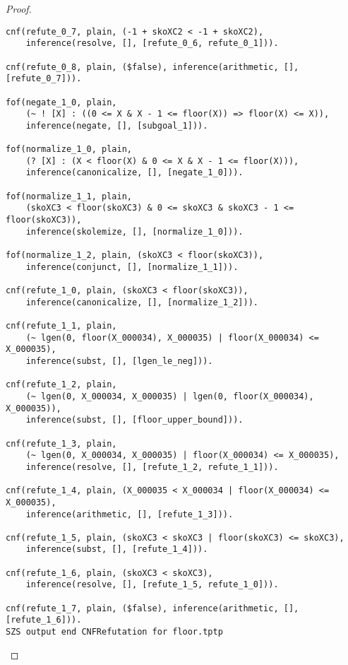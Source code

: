 \begin{proof}
\begin{verbatim}
cnf(refute_0_7, plain, (-1 + skoXC2 < -1 + skoXC2),
    inference(resolve, [], [refute_0_6, refute_0_1])).

cnf(refute_0_8, plain, ($false), inference(arithmetic, [], [refute_0_7])).

fof(negate_1_0, plain,
    (~ ! [X] : ((0 <= X & X - 1 <= floor(X)) => floor(X) <= X)),
    inference(negate, [], [subgoal_1])).

fof(normalize_1_0, plain,
    (? [X] : (X < floor(X) & 0 <= X & X - 1 <= floor(X))),
    inference(canonicalize, [], [negate_1_0])).

fof(normalize_1_1, plain,
    (skoXC3 < floor(skoXC3) & 0 <= skoXC3 & skoXC3 - 1 <= floor(skoXC3)),
    inference(skolemize, [], [normalize_1_0])).

fof(normalize_1_2, plain, (skoXC3 < floor(skoXC3)),
    inference(conjunct, [], [normalize_1_1])).

cnf(refute_1_0, plain, (skoXC3 < floor(skoXC3)),
    inference(canonicalize, [], [normalize_1_2])).

cnf(refute_1_1, plain,
    (~ lgen(0, floor(X_000034), X_000035) | floor(X_000034) <= X_000035),
    inference(subst, [], [lgen_le_neg])).

cnf(refute_1_2, plain,
    (~ lgen(0, X_000034, X_000035) | lgen(0, floor(X_000034), X_000035)),
    inference(subst, [], [floor_upper_bound])).

cnf(refute_1_3, plain,
    (~ lgen(0, X_000034, X_000035) | floor(X_000034) <= X_000035),
    inference(resolve, [], [refute_1_2, refute_1_1])).

cnf(refute_1_4, plain, (X_000035 < X_000034 | floor(X_000034) <= X_000035),
    inference(arithmetic, [], [refute_1_3])).

cnf(refute_1_5, plain, (skoXC3 < skoXC3 | floor(skoXC3) <= skoXC3),
    inference(subst, [], [refute_1_4])).

cnf(refute_1_6, plain, (skoXC3 < skoXC3),
    inference(resolve, [], [refute_1_5, refute_1_0])).

cnf(refute_1_7, plain, ($false), inference(arithmetic, [], [refute_1_6])).
SZS output end CNFRefutation for floor.tptp
\end{verbatim}
\fi
\end{proof}


